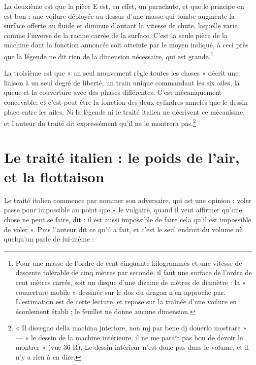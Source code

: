 \documentclass[11pt,a4paper]{article}
\begin{document}
La deuxième est que la pièce E est, en effet, un parachute, et que le principe en
est bon : une voilure déployée au-dessus d'une masse qui tombe augmente la
surface offerte au fluide et diminue d'autant la vitesse de chute, laquelle
varie comme l'inverse de la racine carrée de la surface. C'est la seule pièce de
la machine dont la fonction annoncée soit atteinte par le moyen indiqué, à ceci
près que la légende ne dit rien de la dimension nécessaire, qui est
grande.\footnote{Pour une masse de l'ordre de cent cinquante kilogrammes et une
vitesse de descente tolérable de cinq mètres par seconde, il faut une surface de
l'ordre de cent mètres carrés, soit un disque d'une dizaine de mètres de
diamètre : la « couuerture mobile » dessinée sur le dos du dragon n'en approche
pas. L'estimation est de cette lecture, et repose sur la traînée d'une voilure
en écoulement établi ; le feuillet ne donne aucune dimension.}

La troisième est que « un seul mouvement règle toutes les choses » décrit une
liaison à un seul degré de liberté, un train unique commandant les six ailes, la
queue et la couverture avec des phases différentes. C'est mécaniquement
concevable, et c'est peut-être la fonction des deux cylindres annelés que le
dessin place entre les ailes. Ni la légende ni le traité italien ne décrivent ce
mécanisme, et l'auteur du traité dit expressément qu'il ne le montrera
pas.\footnote{« Il dissegno della machina jnteriore, non mj par bene dj douerlo
mostrare » — « le dessin de la machine intérieure, il ne me paraît pas bon de
devoir le montrer » (vue 36 R). Le dessin intérieur n'est donc pas dans le
volume, et il n'y a rien à en dire.}

\section*{Le traité italien : le poids de l'air, et la flottaison}

Le traité italien commence par nommer son adversaire, qui est une opinion :
voler passe pour impossible au point que « le vulgaire, quand il veut affirmer
qu'une chose ne peut se faire, dit : il est aussi impossible de faire cela qu'il
est impossible de voler ». Puis l'auteur dit ce qu'il a fait, et c'est le seul
endroit du volume où quelqu'un parle de lui-même :
\end{document}
